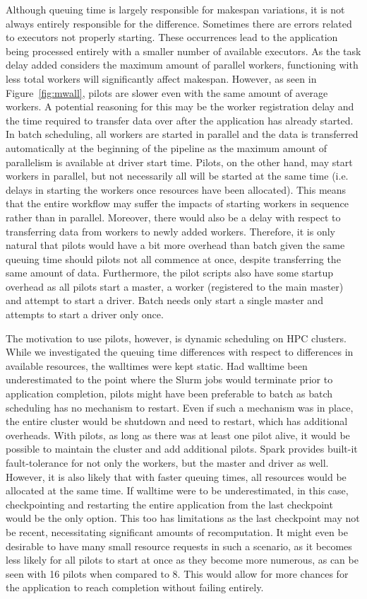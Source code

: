 \documentclass{IEEEtran}
\begin{document}
Although queuing time is largely responsible for makespan variations, it is not
always entirely responsible for the difference. Sometimes there are errors related
to executors not properly starting. These occurrences lead to the 
application being processed entirely with a smaller number of available executors. As the task
delay added considers the maximum amount of parallel workers, functioning with less total workers
will significantly affect makespan. However, as seen in Figure~\ref{fig:mwall},
pilots are slower even with the same amount of average workers. A potential reasoning for this
may be the worker registration delay and the time required to transfer data
over after the application has already started. In batch scheduling, all workers are started in
parallel and the data is transferred automatically at the beginning of the pipeline as the maximum amount
of parallelism is available at driver start time. Pilots, on the other hand, may start workers in parallel,
but not necessarily all will be started at the same time (i.e. delays in starting the workers once resources
have been allocated). This means that the entire 
workflow may suffer the impacts of starting workers in sequence rather than in parallel. Moreover, there would also
be a delay with respect to transferring data from workers to newly added workers. Therefore,
it is only natural that pilots would have a bit more overhead than batch given the same
queuing time should pilots not all commence at once, despite transferring the same amount of data.
 Furthermore, the pilot scripts also
have some startup overhead as all pilots start a master, a worker (registered to the main
master) and attempt to start a driver. Batch needs only start a single master and attempts to start
a driver only once.

The motivation to use pilots, however, is dynamic scheduling on HPC clusters. While we
investigated the queuing time differences with respect to differences in available resources,
the walltimes were kept static. Had walltime been underestimated to the point where the Slurm jobs
would terminate prior to application completion, pilots might have been preferable to batch
as batch scheduling has no mechanism to restart. Even if such a mechanism was in place, the entire
cluster would be shutdown and need to restart, which has additional overheads. With pilots, as long as 
there was at least one pilot alive, it would be possible to maintain the cluster and add additional pilots.
Spark provides built-it fault-tolerance for not only the workers, but the master and driver as well. However,
it is also likely that with faster queuing times, all resources would be allocated at the same time. If walltime
were to be underestimated, in this case, checkpointing and restarting the entire application from the last
checkpoint would be the only option. This too has limitations as the last checkpoint may not be recent,
necessitating significant amounts of recomputation. It
might even be desirable to have many small resource requests in such a scenario, as it becomes less likely for all pilots to start at once as they become more numerous, as can be seen with 16 pilots when compared to 8. This would allow
for more chances for the application to reach completion without failing entirely.
\end{document}
